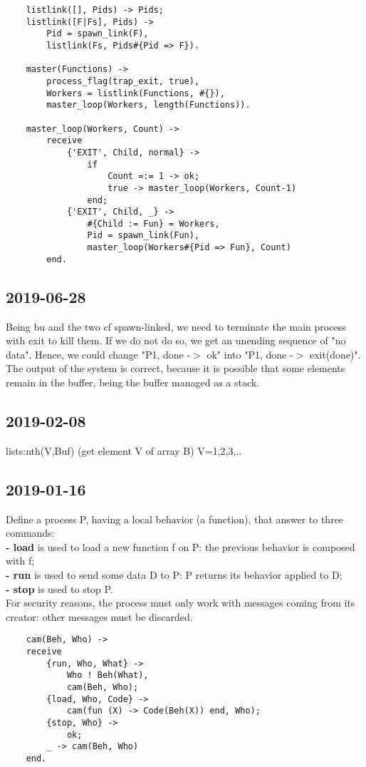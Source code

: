 \begin{lstlisting}
    listlink([], Pids) -> Pids;
    listlink([F|Fs], Pids) ->
        Pid = spawn_link(F),
        listlink(Fs, Pids#{Pid => F}).

    master(Functions) ->
        process_flag(trap_exit, true),
        Workers = listlink(Functions, #{}),
        master_loop(Workers, length(Functions)).

    master_loop(Workers, Count) ->
        receive
            {'EXIT', Child, normal} ->
                if
                    Count =:= 1 -> ok;
                    true -> master_loop(Workers, Count-1)
                end;
            {'EXIT', Child, _} ->
                #{Child := Fun} = Workers,
                Pid = spawn_link(Fun),
                master_loop(Workers#{Pid => Fun}, Count)
        end.
\end{lstlisting}

\subsection{2019-06-28}
Being bu and the two cf spawn-linked, we need to terminate the main process with exit to kill them. If we do not do
so, we get an unending sequence of "no data". Hence, we could change "{P1, done} -$>$ ok" into "{P1, done} -$>$ exit(done)".
The output of the system is correct, because it is possible that some elements remain in the buffer, being the buffer managed as a
stack.

\subsection{2019-02-08}
lists:nth(V,Buf) (get element V of array B) V=1,2,3,..

\subsection{2019-01-16}
Define a process P, having a local behavior (a function), that answer to three commands: \\
\textbf{- load} is used to load a new function f on P: the previous behavior is composed with f; \\
\textbf{- run} is used to send some data D to P: P returns its behavior applied to D; \\
\textbf{- stop} is used to stop P. \\
For security reasons, the process must only work with messages coming from its creator: other messages must be discarded.
\begin{lstlisting}
    cam(Beh, Who) ->
    receive
        {run, Who, What} ->
            Who ! Beh(What),
            cam(Beh, Who);
        {load, Who, Code} ->
            cam(fun (X) -> Code(Beh(X)) end, Who);
        {stop, Who} ->
            ok;
        _ -> cam(Beh, Who)
    end.
\end{lstlisting}

